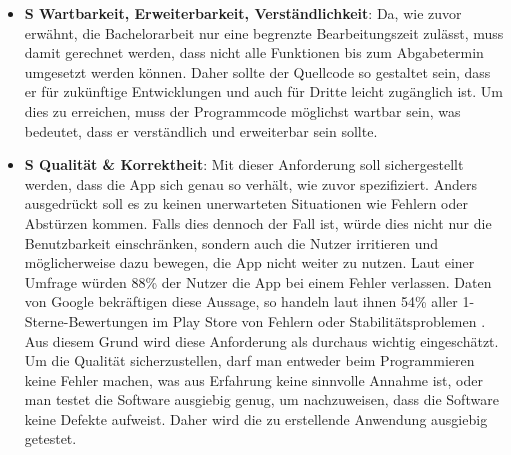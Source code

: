 \begin{itemize}
		
	\item \textbf{S Wartbarkeit, Erweiterbarkeit, Verständlichkeit}: %
		Da, wie zuvor erwähnt, die Bachelorarbeit nur eine begrenzte Bearbeitungszeit zulässt, muss damit gerechnet werden, dass nicht alle Funktionen bis zum Abgabetermin umgesetzt werden können.  %
		Daher sollte der Quellcode so gestaltet sein, dass er für zukünftige Entwicklungen und auch für Dritte leicht zugänglich ist. %
		Um dies zu erreichen, muss der Programmcode möglichst wartbar sein, was bedeutet, dass er verständlich und erweiterbar sein sollte.\newline%
		

	\item \textbf{S Qualität \& Korrektheit}: %
		Mit dieser Anforderung soll sichergestellt werden, dass die App sich genau so verhält, wie zuvor spezifiziert. Anders ausgedrückt soll es zu keinen unerwarteten Situationen wie Fehlern oder Abstürzen kommen. %
		Falls dies dennoch der Fall ist, würde dies nicht nur die Benutzbarkeit einschränken, sondern auch die Nutzer irritieren und möglicherweise dazu bewegen, die App nicht weiter zu nutzen. %
			Laut einer Umfrage würden 88\% der Nutzer die App bei einem Fehler verlassen\cite{nfA_bugsAbandon}. Daten von Google bekräftigen diese Aussage, so handeln laut ihnen 54\% aller 1-Sterne-Bewertungen im Play Store von Fehlern oder Stabilitätsproblemen \cite{nfA_bugsReview}. %
			Aus diesem Grund wird diese Anforderung als durchaus wichtig eingeschätzt.\newline%
		Um die Qualität sicherzustellen, darf man entweder beim Programmieren keine Fehler machen, was aus Erfahrung keine sinnvolle Annahme ist, oder man testet die Software ausgiebig genug, um nachzuweisen, dass die Software keine Defekte aufweist. 
		Daher wird die zu erstellende Anwendung ausgiebig getestet. %
	

\end{itemize}
